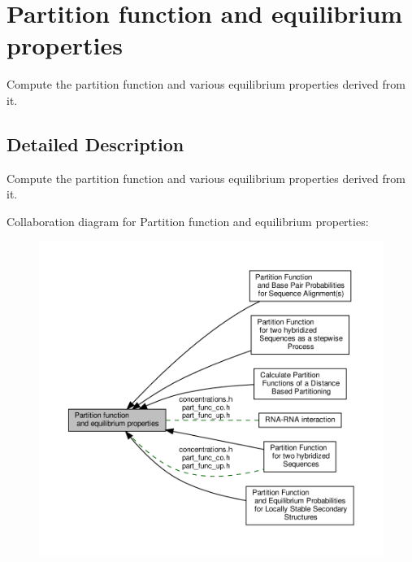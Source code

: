 \hypertarget{group__pf__fold}{}\section{Partition function and equilibrium properties}
\label{group__pf__fold}


Compute the partition function and various equilibrium properties derived from it.  




\subsection{Detailed Description}
Compute the partition function and various equilibrium properties derived from it. 

Collaboration diagram for Partition function and equilibrium properties\+:
\nopagebreak
\begin{figure}[H]
\begin{center}
\leavevmode
\includegraphics[width=350pt]{group__pf__fold}
\end{center}
\end{figure}
